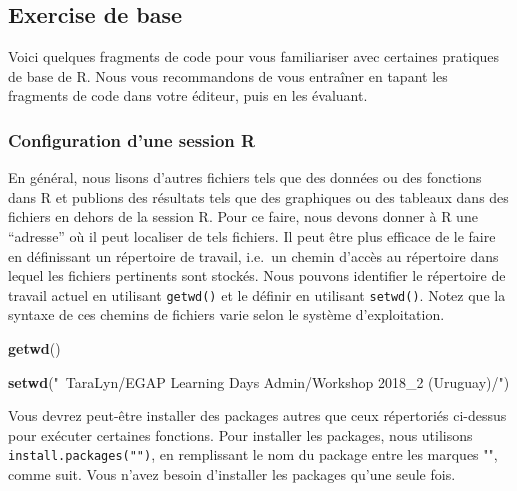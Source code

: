 \documentclass[12pt,]{book}
\newenvironment{Shaded}{\begin{snugshade}}{\end{snugshade}}
\newcommand{\KeywordTok}[1]{\textcolor[rgb]{0.13,0.29,0.53}{\textbf{#1}}}
\newcommand{\NormalTok}[1]{#1}
\newcommand{\StringTok}[1]{\textcolor[rgb]{0.31,0.60,0.02}{#1}}
\begin{document}
\hypertarget{exercise-de-base}{%
\subsection{Exercise de base}\label{exercise-de-base}}

Voici quelques fragments de code pour vous familiariser avec certaines pratiques de base de R. Nous vous recommandons de vous entraîner en tapant les fragments de code dans votre éditeur, puis en les évaluant.

\hypertarget{configuration-dune-session-r}{%
\subsubsection{Configuration d'une session R}\label{configuration-dune-session-r}}

En général, nous lisons d'autres fichiers tels que des données ou des fonctions dans R et publions des résultats tels que des graphiques ou des tableaux dans des fichiers en dehors de la session R. Pour ce faire, nous devons donner à R une ``adresse'' où il peut localiser de tels fichiers. Il peut être plus efficace de le faire en définissant un répertoire de travail, i.e.~un chemin d'accès au répertoire dans lequel les fichiers pertinents sont stockés. Nous pouvons identifier le répertoire de travail actuel en utilisant \texttt{getwd()} et le définir en utilisant \texttt{setwd()}. Notez que la syntaxe de ces chemins de fichiers varie selon le système d'exploitation.

\begin{Shaded}
\begin{Highlighting}[]
\KeywordTok{getwd}\NormalTok{()}
\end{Highlighting}
\end{Shaded}

\begin{Shaded}
\begin{Highlighting}[]
\KeywordTok{setwd}\NormalTok{(}\StringTok{"~TaraLyn/EGAP Learning Days Admin/Workshop 2018_2 (Uruguay)/"}\NormalTok{)}
\end{Highlighting}
\end{Shaded}

Vous devrez peut-être installer des packages autres que ceux répertoriés ci-dessus pour exécuter certaines fonctions. Pour installer les packages, nous utilisons \texttt{install.packages("")}, en remplissant le nom du package entre les marques "", comme suit. Vous n'avez besoin d'installer les packages qu'une seule fois.
\end{document}
